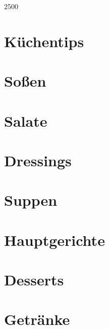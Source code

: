 \documentclass[10pt, a4paper, twoside]{book} %
\makeatletter
\newcommand\GRAANDE{\@setfontsize\Huge{250}{0}}
\makeatother
\begin{document}
\renewcommand{\indexname}{S\-t\-i\-c\-h\-w\-o\-r\-t\-v\-e\-r\-z\-e\-i\-c\-h\-n\-i\-s}

\justify
\setlength\parindent{0pt}

\thispagestyle{empty}
\vspace*{3cm}
\begin{center}
{\GRAANDE{\textsc{}}}
\vspace{2cm}
\end{center}
\vspace{3cm}
\newpage

\tableofcontents

\cleardoublepage
\printindex

\cleardoublepage
{}

\chapter{K\-ü\-c\-h\-e\-n\-t\-i\-p\-s}
\thispagestyle{empty}

\chapter{S\-o\-ß\-e\-n}
\thispagestyle{empty}

\chapter{S\-a\-l\-a\-t\-e}
\thispagestyle{empty}

\chapter{D\-r\-e\-s\-s\-i\-n\-g\-s}
\thispagestyle{empty}

\chapter{S\-u\-p\-p\-e\-n}
\thispagestyle{empty}

\chapter{H\-a\-u\-p\-t\-g\-e\-r\-i\-c\-h\-t\-e}
\thispagestyle{empty}

\chapter{D\-e\-s\-s\-e\-r\-t\-s}
\thispagestyle{empty}

\chapter{G\-e\-t\-r\-ä\-n\-k\-e}
\thispagestyle{empty}

\end{document}
